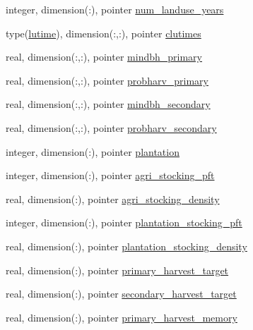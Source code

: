 \begin{DoxyCompactItemize}
integer, dimension(\+:), pointer \hyperlink{structed__state__vars_1_1polygontype_a9686b3539b46859de99ba05a30454902}{num\+\_\+landuse\+\_\+years}
\item 
type(\hyperlink{structdisturb__coms_1_1lutime}{lutime}), dimension(\+:,\+:), pointer \hyperlink{structed__state__vars_1_1polygontype_ad01c448f4d8cc9214c0aafc05aa06980}{clutimes}
\item 
real, dimension(\+:,\+:), pointer \hyperlink{structed__state__vars_1_1polygontype_a3225c8dc28ba33fdd8a89812f5de0a2a}{mindbh\+\_\+primary}
\item 
real, dimension(\+:,\+:), pointer \hyperlink{structed__state__vars_1_1polygontype_a1031b50c05bb751b27d10e27c8673339}{probharv\+\_\+primary}
\item 
real, dimension(\+:,\+:), pointer \hyperlink{structed__state__vars_1_1polygontype_a0114acd73c728f1af50be39af336580a}{mindbh\+\_\+secondary}
\item 
real, dimension(\+:,\+:), pointer \hyperlink{structed__state__vars_1_1polygontype_a0e7f43b4062dcd441f686ec383868adf}{probharv\+\_\+secondary}
\item 
integer, dimension(\+:), pointer \hyperlink{structed__state__vars_1_1polygontype_ae2cc347494c5af3a27157dd26a8a2c36}{plantation}
\item 
integer, dimension(\+:), pointer \hyperlink{structed__state__vars_1_1polygontype_ab0d159e1ff4b125d9491d86d6273c6a3}{agri\+\_\+stocking\+\_\+pft}
\item 
real, dimension(\+:), pointer \hyperlink{structed__state__vars_1_1polygontype_a176bd1da3733aec453ae3fad122e8826}{agri\+\_\+stocking\+\_\+density}
\item 
integer, dimension(\+:), pointer \hyperlink{structed__state__vars_1_1polygontype_a5ed9365b65c8b366dd6d40eacdef2e54}{plantation\+\_\+stocking\+\_\+pft}
\item 
real, dimension(\+:), pointer \hyperlink{structed__state__vars_1_1polygontype_a11018002a68c2f5f2f41b49c67ec9499}{plantation\+\_\+stocking\+\_\+density}
\item 
real, dimension(\+:), pointer \hyperlink{structed__state__vars_1_1polygontype_a80a6c388c4e2f81f3e633c640747a9d4}{primary\+\_\+harvest\+\_\+target}
\item 
real, dimension(\+:), pointer \hyperlink{structed__state__vars_1_1polygontype_ad9dcbfad7f9f46a2aed8f73409790995}{secondary\+\_\+harvest\+\_\+target}
\item 
real, dimension(\+:), pointer \hyperlink{structed__state__vars_1_1polygontype_ac1383dd940a13627c9825bffa8de0486}{primary\+\_\+harvest\+\_\+memory}

\end{DoxyCompactItemize}
